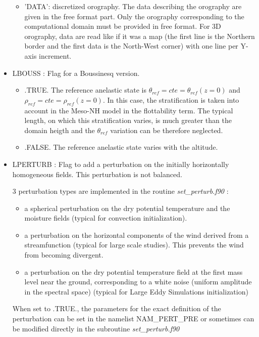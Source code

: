 \begin{itemize}
\begin{itemize}
\item 'DATA': discretized orography. The data describing the orography 
are given in the free format part. 
Only the orography corresponding
to the computational domain must be provided in free format. For 3D orography,
data are read like if it was a map (the first line is the Northern border and
the first data is the North-West corner) with one line per Y-axis increment.
\end{itemize}

\item LBOUSS  : Flag for a Boussinesq version. 
\begin{itemize}
\item .TRUE. The reference anelastic state is  $\theta _{ref} =
cte = \theta _{ref} (z=0) $ and $ \rho _{ref} = cte = \rho _{ref}  (z=0) $. 
In this case, the stratification is taken into account in the Meso-NH model in
the flottability term. The typical length, on which this stratification
varies, is much greater than the domain heigth and the   $\theta _{ref}$
variation can be therefore neglected.
\item .FALSE. The reference anelastic state varies with the altitude.
\end{itemize}

\item LPERTURB  : Flag to add a perturbation on the initially horizontally homogeneous fields.
This perturbation is not balanced. 

3 perturbation types are implemented in the routine {\it set\_perturb.f90} :
\begin{itemize}
\item 
a spherical perturbation  on the dry potential temperature  and the moisture 
fields (typical for convection initialization).
\item 
a  perturbation on the horizontal components of the wind derived
from a streamfunction (typical for large scale studies).
 This prevents the wind from becoming divergent. 
\item 
a  perturbation on the dry potential temperature field at the first mass level
near the ground, corresponding to a white noise (uniform amplitude in the
spectral space) (typical for Large Eddy Simulations initialization)  
\end{itemize}
When set to .TRUE., the parameters for the exact definition of the perturbation can
be set in the namelist NAM\_PERT\_PRE or sometimes can be
modified directly in the subroutine {\it set\_perturb.f90}


\end{itemize}
